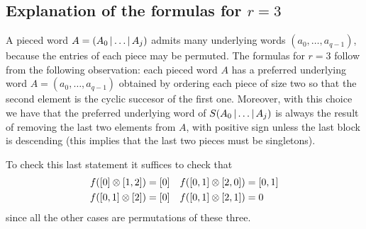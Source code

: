 \subsection{Explanation of the formulas for \texorpdfstring{$r=3$}{r = 3}} A pieced word $A = (A_0\operatorname{|}\dots\operatorname{|} A_j)$ admits many underlying words $(a_0,\dots,a_{q-1})$, because the entries of each piece may be permuted. The formulas for $r=3$ follow from the following observation: each pieced word $A$ has a preferred underlying word $A = (a_0,\dots,a_{q-1})$ obtained by ordering each piece of size two so that the second element is the cyclic succesor of the first one. Moreover, with this choice we have that the preferred underlying word of $S(A_0\operatorname{|}\dots\operatorname{|} A_{j})$ is always the result of removing the last two elements from $A$, with positive sign unless the last block is descending (this implies that the last two pieces must be singletons).

To check this last statement it suffices to check that
\begin{align*}
	f([0] \otimes [1,2]) &= [0]
	&
	f([0,1] \otimes [2,0]) &= [0,1]
	\\
		f([0,1] \otimes [2]) &= [0]
	&
	f([0,1] \otimes [2,1]) &= 0
\end{align*}
since all the other cases are permutations of these three.






